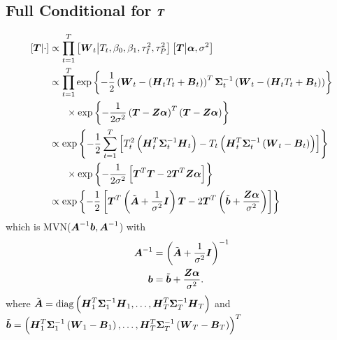 \documentclass{article}\usepackage[]{graphicx}\usepackage[]{color}
\def\bm#1{\mbox{\boldmath $#1$}}
\begin{document}
\subsection{Full Conditional for $\bm{T}$}
%
\begin{align*}
%
\left[ \bm{T} \middle| \cdot \right] & \propto \prod_{t = 1}^T \left[ \bm{W}_t \middle| T_t, \beta_0, \beta_1, \tau^2_I, \tau^2_P \right] \left[ \bm{T} \middle| \bm{\alpha}, \sigma^2 \right] \\
%
& \propto \prod_{t = 1}^T \exp{ \left\{ - \frac{1} {2} \left( \bm{W}_t - \left( \bm{H}_t T_t + \bm{B}_t \right) \right)^T \bm{\Sigma}_t^{ - 1} \left( \bm{W}_t - \left( \bm{H}_t T_t + \bm{B}_t \right)  \right) \right\} }\\
& \hspace{6mm} \times \exp{ \left\{ - \frac{1} {2 \sigma^2} \left( \bm{T} - \bm{Z} \bm{\alpha} \right)^T \left( \bm{T} - \bm{Z} \bm{\alpha} \right) \right\} }\\
%
& \propto \exp{ \left\{ - \frac{1} {2} \sum_{t = 1}^T \left[ T_t^2 \left( \bm{H}_t^T \bm{\Sigma}_t^{ - 1} \bm{H}_t \right) - T_t \left( \bm{H}_t^T \bm{\Sigma}_t^{ - 1} \left( \bm{W}_t - \bm{B}_t \right) \right) \right] \right\} } \\
& \hspace{6mm} \times \exp{ \left\{ - \frac{1} {2 \sigma^2} \left[ \bm{T}^T \bm{T} - 2 \bm{T}^T \bm{Z} \bm{\alpha} \right] \right\} }\\
%
& \propto \exp{ \left\{ - \frac{1} {2} \left[ \bm{T}^T \left( \tilde{\bm{A}} + \frac{1} {\sigma^2} \bm{I} \right) \bm{T} - 2 \bm{T}^T \left( \tilde{\bm{b}} + \frac{\bm{Z} \bm{\alpha}} {\sigma^2} \right) \right] \right\} } \\
%
\end{align*}
%
which is MVN($\bm{A}^{ - 1}\bm{b}, \bm{A}^{ - 1}$) with \\
%
\begin{align*}
%
\bm{A}^{ - 1} & = \left( \tilde{\bm{A}} + \frac{1} {\sigma^2} \bm{I} \right)^{ - 1} \\ 
%
\bm{b} & = \tilde{\bm{b}} + \frac{\bm{Z} \bm{\alpha}} {\sigma^2} .\\
%
\end{align*}
%
where $\tilde{\bm{A}} = \mbox{diag} \left( \bm{H}_1^T \bm{\Sigma}_1^{ - 1} \bm{H}_1, \ldots, \bm{H}_T^T \bm{\Sigma}_T^{ - 1} \bm{H}_T \right)$ and $\tilde{\bm{b}} = \left( \bm{H}_1^T \bm{\Sigma}_1^{ - 1} \left( \bm{W}_1 - \bm{B}_1 \right), \ldots,  \bm{H}_T^T \bm{\Sigma}_T^{ - 1} \left( \bm{W}_T - \bm{B}_T \right) \right)^T$
%
%
\end{document}
